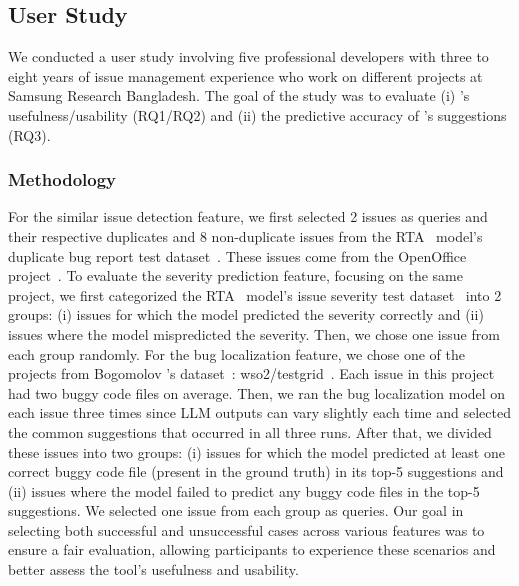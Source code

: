 \subsection{User Study}
We conducted a user study involving five professional developers with three to eight years of issue management experience who work on different projects at Samsung Research Bangladesh. 
The goal of the study was to evaluate (i) \toolname's usefulness/usability {(RQ1/RQ2)} and (ii) the predictive accuracy of \toolname's suggestions {(RQ3)}.

\subsubsection{Methodology}
For the similar issue detection feature, we first selected 2 issues as queries and their respective duplicates and 8 non-duplicate issues from the RTA~\cite{fang2023representthemall} model's duplicate bug report test dataset~\cite{representThemAllDataset}. These issues come from the OpenOffice project~\cite{openoffice}. To evaluate the severity prediction feature, focusing on the same project, we first categorized the RTA~\cite{fang2023representthemall} model's issue severity test dataset~\cite{representThemAllDataset} into 2 groups: (i) issues for which the model predicted the severity correctly and (ii) issues where the model mispredicted the severity. Then, we chose one issue from each group randomly. For the bug localization feature, we chose one of the projects from Bogomolov \etal's dataset~\cite{longCodeBLDataset}: wso2/testgrid~\cite{wso2}. Each issue in this project had two buggy code files on average. Then, we ran the bug localization model on each issue three times since LLM outputs can vary slightly each time and selected the common suggestions that occurred in all three runs. After that, we divided these issues into two groups: (i) issues for which the model predicted at least one correct buggy code file (\ie present in the ground truth) in its top-5 suggestions and (ii) issues where the model failed to predict any buggy code files in the top-5 suggestions. We selected one issue from each group as queries. Our goal in selecting both successful and unsuccessful cases across various features was to ensure a fair evaluation, allowing participants to experience these scenarios and better assess the tool's usefulness and usability.

